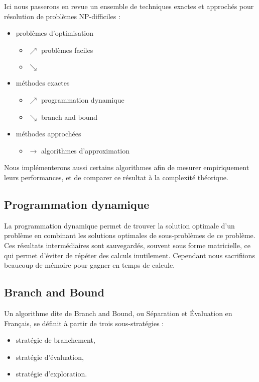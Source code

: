 Ici nous passerons en revue un ensemble de techniques exactes et approchés pour 
résolution de problèmes NP-difficiles :

\begin{itemize}
  \item problèmes d'optimisation 
  \begin{itemize}
    \item[] $\nearrow$ problèmes faciles
    \item[] $\searrow$ 
  \end{itemize}
	\item méthodes exactes 
	\begin{itemize}
		\item[] $\nearrow$ programmation dynamique
		\item[] $\searrow$ branch and bound
	\end{itemize}
	\item méthodes approchées
	\begin{itemize}
		\item[] $\longrightarrow$ algorithmes d'approximation
	\end{itemize}
\end{itemize}

Nous implémenterons aussi certains algorithmes afin de mesurer empiriquement leurs performances, et de comparer ce résultat à la complexité théorique.

\subsection{Programmation dynamique}
La programmation dynamique permet de trouver la solution optimale d'un
problème en combinant les solutions optimales de sous-problèmes de ce
problème. Ces résultats intermédiaires sont sauvegardés, souvent sous
forme matricielle, ce qui permet d'éviter de répéter des calculs inutilement.
Cependant nous sacrifiions beaucoup de mémoire pour gagner en temps de calcule.

\subsection{Branch and Bound}
Un algorithme dite de Branch and Bound, ou Séparation et Évaluation en Français, se définit à partir de trois sous-stratégies :

\begin{itemize}
\item stratégie de branchement,
\item stratégie d'évaluation,
\item stratégie d'exploration.
\end{itemize}

